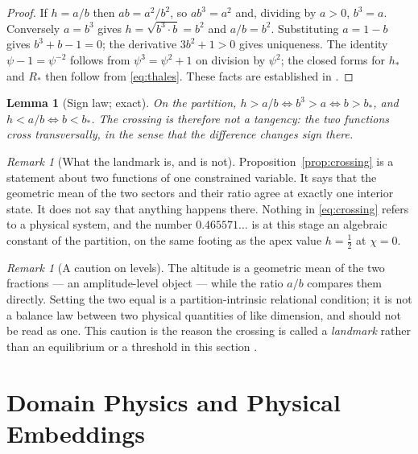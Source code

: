 \documentclass[11pt,a4paper]{article}
\theoremstyle{definition}
\theoremstyle{plain}
\newtheorem{lemma}[definition]{Lemma}
\theoremstyle{remark}
\newtheorem{remark}[definition]{Remark}
\newcommand{\Rresp}{R}
\begin{document}
\begin{proof}
If $h=a/b$ then $ab=a^{2}/b^{2}$, so $ab^{3}=a^{2}$ and, dividing by $a>0$,
$b^{3}=a$. Conversely $a=b^{3}$ gives $h=\sqrt{b^{3}\cdot b}=b^{2}$ and
$a/b=b^{2}$. Substituting $a=1-b$ gives $b^{3}+b-1=0$; the derivative
$3b^{2}+1>0$ gives uniqueness. The identity $\psi-1=\psi^{-2}$ follows from
$\psi^{3}=\psi^{2}+1$ on division by $\psi^{2}$; the closed forms for
$h_{*}$ and $\Rresp_{*}$ then follow from \eqref{eq:thales}. These facts are
established in \cite{IntrinsicCubic}.
\end{proof}

\begin{lemma}[Sign law; exact]
\label{lem:sign}
On the partition, $h>a/b\iff b^{3}>a\iff b>b_{*}$, and $h<a/b\iff b<b_{*}$.
The crossing is therefore not a tangency: the two functions cross
transversally, in the sense that the difference changes sign there.
\end{lemma}

\begin{remark}[What the landmark is, and is not]
\label{rem:landmarkstatus}
Proposition~\ref{prop:crossing} is a statement about two functions of one
constrained variable. It says that the geometric mean of the two sectors and
their ratio agree at exactly one interior state. It does not say that anything
happens there. Nothing in \eqref{eq:crossing} refers to a physical system, and
the number $0.465571\ldots$ is at this stage an algebraic constant of the
partition, on the same footing as the apex value $h=\tfrac12$ at $\chi=0$.
\end{remark}

\begin{remark}[A caution on levels]
\label{rem:levels}
The altitude is a geometric mean of the two fractions --- an amplitude-level
object --- while the ratio $a/b$ compares them directly. Setting the two equal
is a partition-intrinsic relational condition; it is not a balance law between
two physical quantities of like dimension, and should not be read as one. This
caution is the reason the crossing is called a \emph{landmark} rather than an
equilibrium or a threshold in this section \cite{CubicThreshold}.
\end{remark}

\section{Domain Physics and Physical Embeddings}
\label{sec:embedding}
\end{document}

